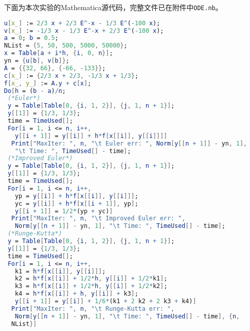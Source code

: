\documentclass[reportComp]{thesis}
\begin{document}
下面为本次实验的Mathematica源代码，完整文件已在附件中\verb'ODE.nb'。
\begin{lstlisting}[language=mathematica]
u[x_] := 2/3 x + 2/3 E^-x - 1/3 E^(-100 x);
v[x_] := -1/3 x - 1/3 E^-x + 2/3 E^(-100 x);
a = 0; b = 0.5;
NList = {5, 50, 500, 5000, 50000};
x = Table[a + i*h, {i, 0, n}];
yn = {u[b], v[b]};
A = {{32, 66}, {-66, -133}};
c[x_] := {2/3 x + 2/3, -1/3 x + 1/3};
f[x_, y_] := A.y + c[x];
Do[h = (b - a)/n;
 (*Euler*)
 y = Table[Table[0, {i, 1, 2}], {j, 1, n + 1}];
 y[[1]] = {1/3, 1/3};
 time = TimeUsed[];
 For[i = 1, i <= n, i++,
   y[[i + 1]] = y[[i]] + h*f[x[[i]], y[[i]]]]
  Print["MaxIter: ", n, "\t Euler err: ", Norm[y[[n + 1]] - yn, 1], 
   "\t Time: ", TimeUsed[] - time];
 (*Improved Euler*)
 y = Table[Table[0, {i, 1, 2}], {j, 1, n + 1}];
 y[[1]] = {1/3, 1/3};
 time = TimeUsed[];
 For[i = 1, i <= n, i++,
   yp = y[[i]] + h*f[x[[i]], y[[i]]];
   yc = y[[i]] + h*f[x[[i + 1]], yp];
   y[[i + 1]] = 1/2*(yp + yc)]
  Print["MaxIter: ", n, "\t Improved Euler err: ", 
   Norm[y[[n + 1]] - yn, 1], "\t Time: ", TimeUsed[] - time];
 (*Runge-Kutta*)
 y = Table[Table[0, {i, 1, 2}], {j, 1, n + 1}];
 y[[1]] = {1/3, 1/3};
 time = TimeUsed[];
 For[i = 1, i <= n, i++,
   k1 = h*f[x[[i]], y[[i]]];
   k2 = h*f[x[[i]] + 1/2*h, y[[i]] + 1/2*k1];
   k3 = h*f[x[[i]] + 1/2*h, y[[i]] + 1/2*k2];
   k4 = h*f[x[[i]] + h, y[[i]] + k3];
   y[[i + 1]] = y[[i]] + 1/6*(k1 + 2 k2 + 2 k3 + k4)]
  Print["MaxIter: ", n, "\t Runge-Kutta err: ", 
   Norm[y[[n + 1]] - yn, 1], "\t Time: ", TimeUsed[] - time], {n, 
  NList}]
\end{lstlisting}
\end{document}
